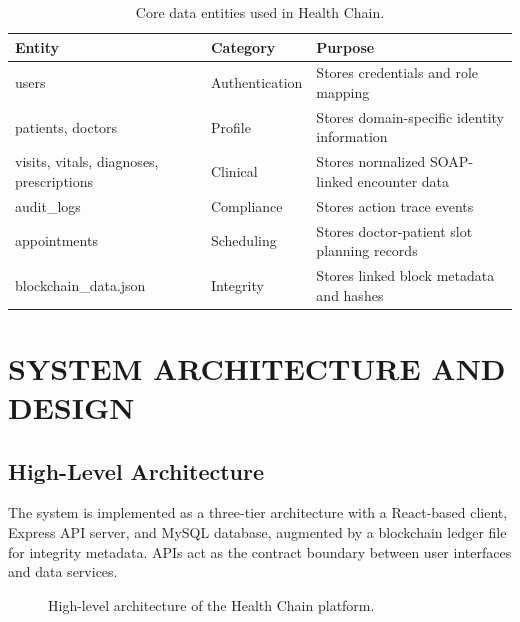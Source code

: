 \documentclass[12pt,a4paper]{report}
\begin{document}
\begin{table}[htbp]
\centering
\caption{Core data entities used in Health Chain.}
\label{tab:core-data-entities}
\begin{tabular}{p{} p{} p{}}
\toprule
\textbf{Entity} & \textbf{Category} & \textbf{Purpose} \\
\midrule
users & Authentication & Stores credentials and role mapping \\
patients, doctors & Profile & Stores domain-specific identity information \\
visits, vitals, diagnoses, prescriptions & Clinical & Stores normalized SOAP-linked encounter data \\
audit\_logs & Compliance & Stores action trace events \\
appointments & Scheduling & Stores doctor-patient slot planning records \\
blockchain\_data.json & Integrity & Stores linked block metadata and hashes \\
\bottomrule
\end{tabular}
\end{table}

\chapter{SYSTEM ARCHITECTURE AND DESIGN}

\section{High-Level Architecture}

The system is implemented as a three-tier architecture with a React-based client, Express API server, and MySQL database, augmented by a blockchain ledger file for integrity metadata. APIs act as the contract boundary between user interfaces and data services.

\begin{figure}[htbp]
\centering
{}
\caption{High-level architecture of the Health Chain platform.}
\label{fig:healthchain-architecture}
\end{figure}
\end{document}
